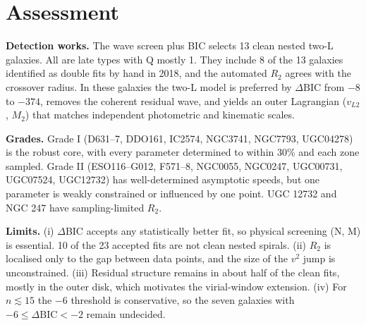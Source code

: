 \documentclass[10pt]{article}
\begin{document}
\section{Assessment}
\textbf{Detection works.} The wave screen plus BIC selects 13 clean nested two-L galaxies. All are late types with Q mostly 1. They include 8 of the 13 galaxies identified as double fits by hand in 2018, and the automated $R_2$ agrees with the crossover radius. In these galaxies the two-L model is preferred by $\Delta\mathrm{BIC}$ from $-8$ to $-374$, removes the coherent residual wave, and yields an outer Lagrangian ($v_{L2}$, $M_2$) that matches independent photometric and kinematic scales.

\textbf{Grades.} Grade I (D631--7, DDO161, IC2574, NGC3741, NGC7793, UGC04278) is the robust core, with every parameter determined to within 30\% and each zone sampled. Grade II (ESO116--G012, F571--8, NGC0055, NGC0247, UGC00731, UGC07524, UGC12732) has well-determined asymptotic speeds, but one parameter is weakly constrained or influenced by one point. UGC 12732 and NGC 247 have sampling-limited $R_2$.

\textbf{Limits.} (i) $\Delta$BIC accepts any statistically better fit, so physical screening (N, M) is essential. 10 of the 23 accepted fits are not clean nested spirals. (ii) $R_2$ is localised only to the gap between data points, and the size of the $v^2$ jump is unconstrained. (iii) Residual structure remains in about half of the clean fits, mostly in the outer disk, which motivates the virial-window extension. (iv) For $n\lesssim 15$ the $-6$ threshold is conservative, so the seven galaxies with $-6\le\Delta\mathrm{BIC}<-2$ remain undecided.
\end{document}
